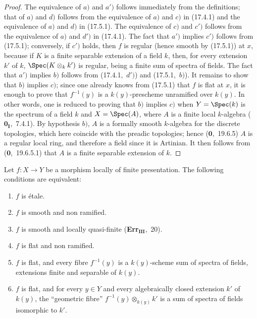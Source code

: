 \begin{proof}
The equivalence of $a)$ and $a')$ follows immediately from the definitions; that of $a)$ and $d)$ follows from the equivalence of $a)$ and $c)$ in (17.4.1) and the equivalence of $a)$ and $d)$ in (17.5.1).
The equivalence of $c)$ and $c')$ follows from the equivalence of $a)$ and $d')$ in (17.4.1).
The fact that $a')$ implies $c')$ follows from (17.5.1); conversely, if $c')$ holds, then $f$ is regular (hence smooth by (17.5.1)) at $x$, because if $K$ is a finite separable extension of a field $k$, then, for every extension $k'$ of $k$, $\Spec(K\otimes_k k')$ is regular, being a finite sum of spectra of fields.
The fact that $a')$ implies $b)$ follows from (17.4.1,~$d')$) and (17.5.1,~$b)$).
It remains to show that $b)$ implies $c)$; since one already knows from (17.5.1) that $f$ is flat at $x$, it is enough to prove that $f^{-1}(y)$ is a $k(y)$-prescheme unramified over $k(y)$.
In other words, one is reduced to proving that $b)$ implies $c)$ when $Y=\Spec(k)$ is the spectrum of a field $k$ and $X=\Spec(A)$, where $A$ is a finite local $k$-algebra ($\mathbf{0}_\mathbf{I}$,~7.4.1).
By hypothesis $b)$, $A$ is a formally smooth $k$-algebra for the discrete topologies, which here coincide with the preadic topologies; hence ($\mathbf{0}$,~19.6.5) $A$ is a regular local ring, and therefore a field since it is Artinian.
It then follows from ($\mathbf{0}$,~19.6.5.1) that $A$ is a finite separable extension of $k$.
\end{proof}

\begin{corollary}[17.6.2]
\label{IV.17.6.2}
Let $f:X\to Y$ be a morphism locally of finite presentation.
The following conditions are equivalent:
\begin{enumerate}[label=(\alph*)]
  \item $f$ is \'etale.
  \item[a')] $f$ is smooth and non ramified.
  \item $f$ is smooth and locally quasi-finite (\textbf{Err}$_\textbf{III}$,~20).
  \item $f$ is flat and non ramified.
  \item[c')] $f$ is flat, and every fibre $f^{-1}(y)$ is a $k(y)$-scheme sum of spectra of fields, extensions finite and separable of $k(y)$.
  \item[c'')] $f$ is flat, and for every $y\in Y$ and every algebraically closed extension $k'$ of $k(y)$, the ``geometric fibre'' $f^{-1}(y)\otimes_{k(y)}k'$ is a sum of spectra of fields isomorphic to $k'$.
\end{enumerate}
\end{corollary}


